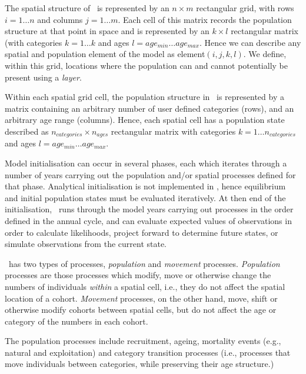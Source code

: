 The spatial structure of \SPM\ is represented by an $n \times m$ rectangular grid, with rows $i=1 \dots n$ and columns $j=1 \ldots m$. Each cell of this matrix records the population structure at that point in space and is represented by an $k \times l$ rectangular matrix (with categories $k=1 \ldots k$ and ages $l=age_{min} \ldots age_{max}$. Hence we can describe any spatial and population element of the model as element$(i,j,k,l)$. We define, within this grid, locations where the population can and cannot potentially be present using a \emph{layer}. 

Within each spatial grid cell, the population structure in \SPM\ is represented by a matrix containing an arbitrary number of user defined categories (rows), and an arbitrary age range (columns). Hence, each spatial cell has a population state described as $n_{categories} \times n_{ages}$ rectangular matrix with categories $k=1 \ldots n_{categories}$ and ages $l=age_{min} \ldots age_{max}$. 

Model initialisation can occur in several phases, each which iterates through a number of years carrying out the population and/or spatial processes defined for that phase. Analytical initialisation is not implemented in \SPM, hence equilibrium and initial population states must be evaluated iteratively. At then end of the initialisation, \SPM\ runs through the model years carrying out processes in the order defined in the annual cycle, and can evaluate expected values of observations in order to calculate likelihoods, project forward to determine future states, or simulate observations from the current state.

\SPM\ has two types of processes, \emph{population} and \emph{movement} processes. \emph{Population} processes are those processes which modify, move or otherwise change the numbers of individuals \emph{within} a spatial cell, i.e., they do not affect the spatial location of a cohort. \emph{Movement} processes, on the other hand, move, shift or otherwise modify cohorts between spatial cells, but do not affect the age or category of the numbers in each cohort. 

The population processes include recruitment, ageing,  mortality events (e.g., natural and exploitation) and category transition processes (i.e., processes that move individuals between categories, while preserving their age structure.) 

